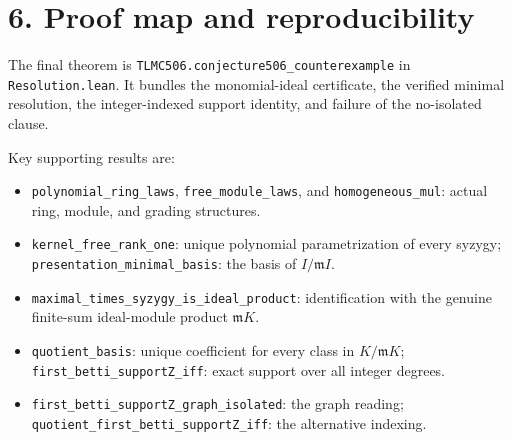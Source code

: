 \documentclass[11pt]{article}
\newcommand{\m}{\mathfrak m}
\begin{document}
\newpage
\section*{6. Proof map and reproducibility}
The final theorem is
\texttt{TLMC506.conjecture506\_\allowbreak{}counterexample} in \texttt{Resolution.lean}.
It bundles the monomial-ideal certificate, the verified minimal resolution,
the integer-indexed support identity, and failure of the no-isolated clause.

Key supporting results are:
\begin{itemize}
\item \texttt{polynomial\_\allowbreak{}ring\_\allowbreak{}laws}, \texttt{free\_\allowbreak{}module\_\allowbreak{}laws}, and
\texttt{homogeneous\_\allowbreak{}mul}: actual ring, module, and grading structures.
\item \texttt{kernel\_\allowbreak{}free\_\allowbreak{}rank\_\allowbreak{}one}: unique polynomial parametrization of
every syzygy; \texttt{presentation\_\allowbreak{}minimal\_\allowbreak{}basis}: the basis of $I/\m I$.
\item \texttt{maximal\_\allowbreak{}times\_\allowbreak{}syzygy\_\allowbreak{}is\_\allowbreak{}ideal\_\allowbreak{}product}: identification
with the genuine finite-sum ideal-module product $\m K$.
\item \texttt{quotient\_\allowbreak{}basis}: unique coefficient for every class in $K/\m K$;
\texttt{first\_\allowbreak{}betti\_\allowbreak{}supportZ\_\allowbreak{}iff}: exact support over all integer degrees.
\item \texttt{first\_\allowbreak{}betti\_\allowbreak{}supportZ\_\allowbreak{}graph\_\allowbreak{}isolated}: the graph reading;
\texttt{quotient\_\allowbreak{}first\_\allowbreak{}betti\_\allowbreak{}supportZ\_\allowbreak{}iff}: the alternative indexing.
\end{itemize}
\end{document}
